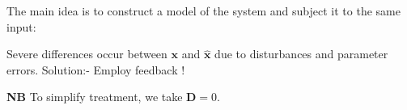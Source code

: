 \begin{slide}
The main idea is to construct a model of the system and subject it to the same input:
\begin{center}
\end{center}
\end{slide}

Severe differences occur between $\mathbf{x}$  and  $\hat{\mathbf{x}}$ due to disturbances and parameter errors. Solution:-  Employ feedback !

\begin{slide}
\begin{center}
\end{center}
\end{slide}
\textbf{NB} To simplify treatment, we take $\mathbf{D}=0$.

